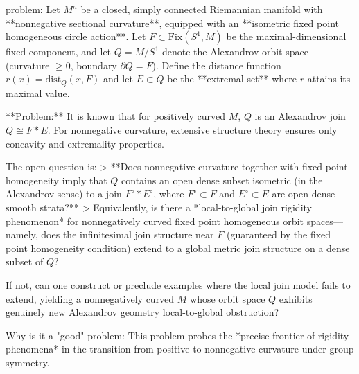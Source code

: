 problem:  
Let \(M^n\) be a closed, simply connected Riemannian manifold with **nonnegative sectional curvature**, equipped with an **isometric fixed point homogeneous circle action**.  
Let \(F \subset \mathrm{Fix}(S^1,M)\) be the maximal-dimensional fixed component, and let \(Q = M/S^1\) denote the Alexandrov orbit space (curvature \(\ge 0\), boundary \(\partial Q = F\)). Define the distance function \(r(x) = \mathrm{dist}_Q(x, F)\) and let \(E \subset Q\) be the **extremal set** where \(r\) attains its maximal value.  

**Problem:**  
It is known that for positively curved \(M\), \(Q\) is an Alexandrov join \(Q \cong F * E\). For nonnegative curvature, extensive structure theory ensures only concavity and extremality properties.  

The open question is:  
> **Does nonnegative curvature together with fixed point homogeneity imply that \(Q\) contains an open dense subset isometric (in the Alexandrov sense) to a join \(F^\circ * E^\circ\), where \(F^\circ \subset F\) and \(E^\circ \subset E\) are open dense smooth strata?**  
> Equivalently, is there a *local-to-global join rigidity phenomenon* for nonnegatively curved fixed point homogeneous orbit spaces—namely, does the infinitesimal join structure near \(F\) (guaranteed by the fixed point homogeneity condition) extend to a global metric join structure on a dense subset of \(Q\)?  

If not, can one construct or preclude examples where the local join model fails to extend, yielding a nonnegatively curved \(M\) whose orbit space \(Q\) exhibits genuinely new Alexandrov geometry local-to-global obstruction?  

Why is it a "good" problem:  
This problem probes the *precise frontier of rigidity phenomena* in the transition from positive to nonnegative curvature under group symmetry.  

